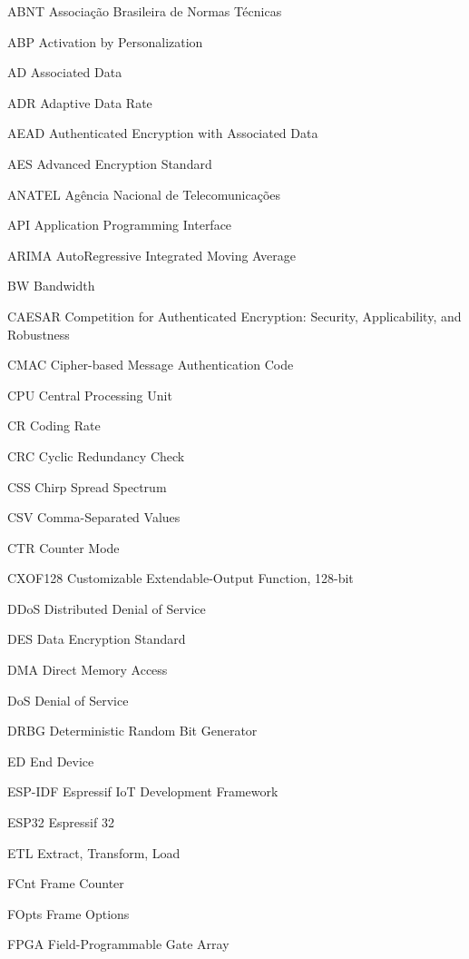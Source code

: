 \documentclass[
	12pt,				%
	openright,			%
	twoside,			%
	a4paper,			%
	english,			%
	brazilian				%
	]{abntex2}
\begin{document}
\begin{siglas}
  \item[ABNT] Associação Brasileira de Normas Técnicas
  \item[ABP] Activation by Personalization
  \item[AD] Associated Data
  \item[ADR] Adaptive Data Rate
  \item[AEAD] Authenticated Encryption with Associated Data
  \item[AES] Advanced Encryption Standard
  \item[ANATEL] Agência Nacional de Telecomunicações
  \item[API] Application Programming Interface
  \item[ARIMA] AutoRegressive Integrated Moving Average
  \item[BW] Bandwidth
  \item[CAESAR] Competition for Authenticated Encryption: Security, Applicability, and Robustness
  \item[CMAC] Cipher-based Message Authentication Code
  \item[CPU] Central Processing Unit
  \item[CR] Coding Rate
  \item[CRC] Cyclic Redundancy Check
  \item[CSS] Chirp Spread Spectrum
  \item[CSV] Comma-Separated Values
  \item[CTR] Counter Mode
  \item[CXOF128] Customizable Extendable-Output Function, 128-bit
  \item[DDoS] Distributed Denial of Service
  \item[DES] Data Encryption Standard
  \item[DMA] Direct Memory Access
  \item[DoS] Denial of Service
  \item[DRBG] Deterministic Random Bit Generator
  \item[ED] End Device
  \item[ESP-IDF] Espressif IoT Development Framework
  \item[ESP32] Espressif 32
  \item[ETL] Extract, Transform, Load
  \item[FCnt] Frame Counter
  \item[FOpts] Frame Options
  \item[FPGA] Field-Programmable Gate Array

\end{siglas}
\end{document}

